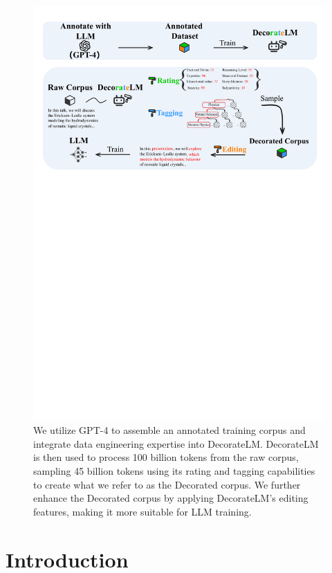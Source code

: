 \documentclass[11pt]{article}
\begin{document}
\begin{figure}
    \centering
\includegraphics[width=\textwidth]{figs/pipeline.pdf}
    \caption{We utilize GPT-4 to assemble an annotated training corpus and integrate data engineering expertise into DecorateLM. DecorateLM is then used to process 100 billion tokens from the raw corpus, sampling 45 billion tokens using its rating and tagging capabilities to create what we refer to as the Decorated corpus. We further enhance the Decorated corpus by applying DecorateLM's editing features, making it more suitable for LLM training.}
    \label{fig:flow}
\end{figure}

\section{Introduction}
\label{sec:introduction}
\end{document}
